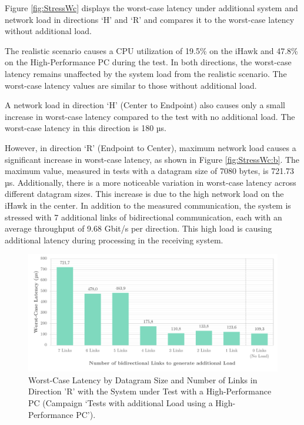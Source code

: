 Figure \ref{fig:StressWc} displays the worst-case latency under additional system and network load in directions `H' and `R' and compares it to the worst-case latency without additional load.

The realistic scenario causes a \ac{CPU} utilization of 19.5\% on the iHawk and 47.8\% on the High-Performance PC during the test. In both directions, the worst-case latency remains unaffected by the system load from the realistic scenario. The worst-case latency values are similar to those without additional load.

A network load in direction `H' (Center to Endpoint) also causes only a small increase in worst-case latency compared to the test with no additional load. The worst-case latency in this direction is 180 µs.

However, in direction `R' (Endpoint to Center), maximum network load causes a significant increase in worst-case latency, as shown in Figure \ref{fig:StressWc:b}. The maximum value, measured in tests with a datagram size of 7080 bytes, is 721.73 µs. Additionally, there is a more noticeable variation in worst-case latency across different datagram sizes. This increase is due to the high network load on the iHawk in the center. In addition to the measured communication, the system is stressed with 7 additional links of bidirectional communication, each with an average throughput of 9.68 Gbit/s per direction. This high load is causing additional latency during processing in the receiving system.

\begin{figure}[h!]
    \centering
    \includegraphics[width=1\linewidth]{figures/performance/d_13.pdf}
    \caption{Worst-Case Latency by Datagram Size and Number of Links in Direction 'R' with the System under Test with a High-Performance PC (Campaign `Tests with additional Load using a High-Performance PC').}
    \label{fig:NetLoadLinkReduction}
\end{figure}

